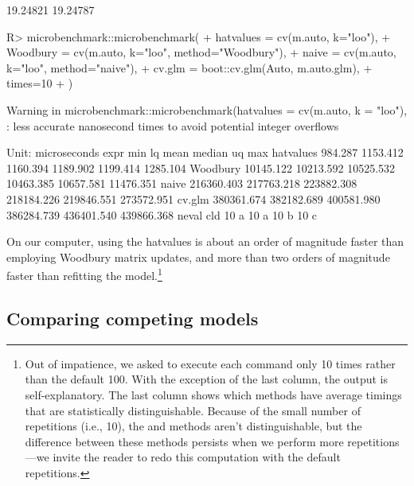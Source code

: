 \documentclass[
]{jss}
\begin{document}
\begin{CodeChunk}
\begin{CodeOutput}
[1] 19.24821 19.24787
\end{CodeOutput}
\begin{CodeInput}
R> microbenchmark::microbenchmark(
+   hatvalues = cv(m.auto, k="loo"),
+   Woodbury = cv(m.auto, k="loo", method="Woodbury"),
+   naive = cv(m.auto, k="loo", method="naive"),
+   cv.glm = boot::cv.glm(Auto, m.auto.glm),
+   times=10
+ )
\end{CodeInput}
\begin{CodeOutput}
Warning in microbenchmark::microbenchmark(hatvalues = cv(m.auto, k = "loo"), :
less accurate nanosecond times to avoid potential integer overflows
\end{CodeOutput}
\begin{CodeOutput}
Unit: microseconds
      expr        min         lq       mean     median         uq        max
 hatvalues    984.287   1153.412   1160.394   1189.902   1199.414   1285.104
  Woodbury  10145.122  10213.592  10525.532  10463.385  10657.581  11476.351
     naive 216360.403 217763.218 223882.308 218184.226 219846.551 273572.951
    cv.glm 380361.674 382182.689 400581.980 386284.739 436401.540 439866.368
 neval cld
    10 a  
    10 a  
    10  b 
    10   c
\end{CodeOutput}
\end{CodeChunk}

On our computer, using the hatvalues is about an order of magnitude
faster than employing Woodbury matrix updates, and more than two orders
of magnitude faster than refitting the model.\footnote{Out of
  impatience, we asked  to execute each command
  only 10 times rather than the default 100. With the exception of the
  last column, the output is self-explanatory. The last column shows
  which methods have average timings that are statistically
  distinguishable. Because of the small number of repetitions (i.e.,
  10), the  and  methods aren't
  distinguishable, but the difference between these methods persists
  when we perform more repetitions---we invite the reader to redo this
  computation with the default  repetitions.}

\hypertarget{comparing-competing-models}{%
\subsection{Comparing competing
models}\label{comparing-competing-models}}
\end{document}
